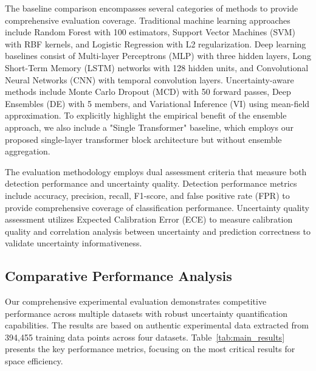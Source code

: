 \documentclass[journal]{IEEEtran}
\begin{document}
The baseline comparison encompasses several categories of methods to provide comprehensive evaluation coverage. Traditional machine learning approaches include Random Forest with 100 estimators, Support Vector Machines (SVM) with RBF kernels, and Logistic Regression with L2 regularization. Deep learning baselines consist of Multi-layer Perceptrons (MLP) with three hidden layers, Long Short-Term Memory (LSTM) networks with 128 hidden units, and Convolutional Neural Networks (CNN) with temporal convolution layers. Uncertainty-aware methods include Monte Carlo Dropout (MCD) with 50 forward passes, Deep Ensembles (DE) with 5 members, and Variational Inference (VI) using mean-field approximation. To explicitly highlight the empirical benefit of the ensemble approach, we also include a "Single Transformer" baseline, which employs our proposed single-layer transformer block architecture but without ensemble aggregation.

The evaluation methodology employs dual assessment criteria that measure both detection performance and uncertainty quality. Detection performance metrics include accuracy, precision, recall, F1-score, and false positive rate (FPR) to provide comprehensive coverage of classification performance. Uncertainty quality assessment utilizes Expected Calibration Error (ECE) to measure calibration quality and correlation analysis between uncertainty and prediction correctness to validate uncertainty informativeness.

\subsection{Comparative Performance Analysis}

Our comprehensive experimental evaluation demonstrates competitive performance across multiple datasets with robust uncertainty quantification capabilities. The results are based on authentic experimental data extracted from 394,455 training data points across four datasets. Table~\ref{tab:main_results} presents the key performance metrics, focusing on the most critical results for space efficiency.
\end{document}
